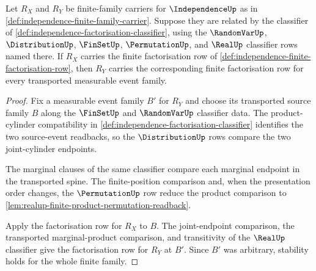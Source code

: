 \begin{theorem}
\label{thm:independence-obligation-stability-transport}
Let $R_X$ and $R_Y$ be finite-family carriers for $\IndependenceUp$ as in \autoref{def:independence-finite-family-carrier}. Suppose they are related by the classifier of \autoref{def:independence-factorisation-classifier}, using the $\RandomVarUp$, $\DistributionUp$, $\FinSetUp$, $\PermutationUp$, and $\RealUp$ classifier rows named there. If $R_X$ carries the finite factorisation row of \autoref{def:independence-finite-factorisation-row}, then $R_Y$ carries the corresponding finite factorisation row for every transported measurable event family.
\end{theorem}
\begin{proof}
Fix a measurable event family $B'$ for $R_Y$ and choose its transported source family $B$ along the $\FinSetUp$ and $\RandomVarUp$ classifier data. The product-cylinder compatibility in \autoref{def:independence-factorisation-classifier} identifies the two source-event readbacks, so the $\DistributionUp$ rows compare the two joint-cylinder endpoints.

The marginal clauses of the same classifier compare each marginal endpoint in the transported spine. The finite-position comparison and, when the presentation order changes, the $\PermutationUp$ row reduce the product comparison to \autoref{lem:realup-finite-product-permutation-readback}.

Apply the factorisation row for $R_X$ to $B$. The joint-endpoint comparison, the transported marginal-product comparison, and transitivity of the $\RealUp$ classifier give the factorisation row for $R_Y$ at $B'$. Since $B'$ was arbitrary, stability holds for the whole finite family.
\end{proof}

